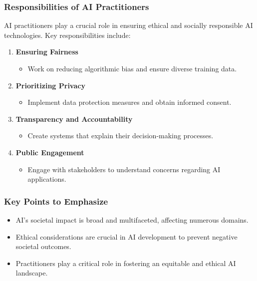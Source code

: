 \documentclass{beamer}
\begin{document}
\begin{frame}[fragile]
    \frametitle{Responsibilities of AI Practitioners}
    
    AI practitioners play a crucial role in ensuring ethical and socially responsible AI technologies. Key responsibilities include:
    
    \begin{enumerate}
        \item \textbf{Ensuring Fairness} 
            \begin{itemize}
                \item Work on reducing algorithmic bias and ensure diverse training data.
            \end{itemize}
        
        \item \textbf{Prioritizing Privacy}
            \begin{itemize}
                \item Implement data protection measures and obtain informed consent.
            \end{itemize}
        
        \item \textbf{Transparency and Accountability}
            \begin{itemize}
                \item Create systems that explain their decision-making processes.
            \end{itemize}
        
        \item \textbf{Public Engagement}
            \begin{itemize}
                \item Engage with stakeholders to understand concerns regarding AI applications.
            \end{itemize}
    \end{enumerate}
\end{frame}

\begin{frame}[fragile]
    \frametitle{Key Points to Emphasize}
    
    \begin{itemize}
        \item AI's societal impact is broad and multifaceted, affecting numerous domains.
        \item Ethical considerations are crucial in AI development to prevent negative societal outcomes.
        \item Practitioners play a critical role in fostering an equitable and ethical AI landscape.
    \end{itemize}
\end{frame}
\end{document}
